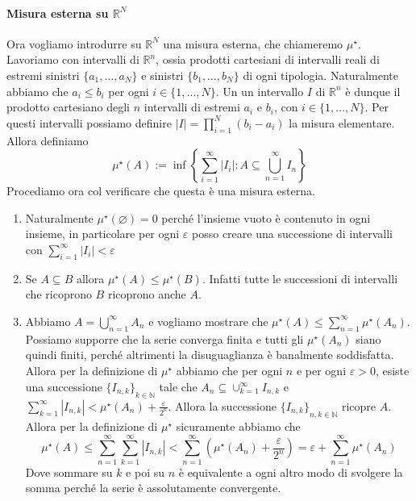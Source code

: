 \paragraph{Misura esterna su \(\mathbb{R}^{N}\)}
Ora vogliamo introdurre su \(\mathbb{R}^{N}\) una misura esterna, che chiameremo
\(\mu^\star\). Lavoriamo con intervalli di \(\mathbb{R}^{n}\), ossia prodotti
cartesiani di intervalli reali di estremi sinistri \(\{a_{1}, \dots, a_{N}\} \)
e sinistri \(\{b_{1}, \dots, b_{N}\} \) di ogni tipologia. Naturalmente abbiamo
che \(a_{i} \le b_{i}\) per ogni \(i \in \{1, \dots, N\}\). Un un intervallo \(I\) di
\(\mathbb{R}^{n}\) è dunque il prodotto cartesiano degli \(n\) intervalli di
estremi \(a_{i}\) e \(b_{i}\), con \(i \in \{1, \dots, N\} \). Per questi
intervalli possiamo definire \(|I| = \prod_{i=1}^{N}(b_{i} - a_{i})\) la misura
elementare. Allora definiamo 
\[
    \mu^\star(A) := \inf\left\{ \sum_{i=1}^{\infty} |I_{i}| : A \subseteq
    \bigcup_{n = 1}^{\infty}I_{n} \right\}
\]
Procediamo ora col verificare che questa è una misura esterna.
\begin{enumerate}[label = \arabic*.]
    \item Naturalmente \(\mu^\star(\varnothing) = 0\) perché l'insieme vuoto è
        contenuto in ogni insieme, in particolare per ogni \(\varepsilon\) posso
        creare una successione di intervalli con \(\sum_{i=1}^{\infty} |I_{i}|
        <\varepsilon \) 
    \item Se \(A \subseteq B \) allora \(\mu^\star(A) \le \mu^\star(B)\).
        Infatti tutte le successioni di intervalli che ricoprono \(B\) ricoprono
        anche \(A\).
    \item Abbiamo \(A = \bigcup_{n=1}^{\infty}A_{n} \) e vogliamo mostrare che
        \(\mu^\star(A) \le \sum_{n=1}^{\infty} \mu^\star(A_{n}) \). Possiamo
        supporre che la serie converga finita e tutti gli \(\mu^\star(A_{n})\)
        siano quindi finiti, perché altrimenti la disuguaglianza è
        banalmente soddisfatta. Allora per la definizione di \(\mu^\star\)
        abbiamo che per ogni \(n\) e per ogni \(\varepsilon>0\), esiste una
        successione \({\{I_{n, k}\}}_{k \in \mathbb{N}} \) tale che \(A_{n}
        \subseteq \cup_{k=1}^{\infty} I_{n, k} \) e \(\sum_{k=1}^{\infty}
        |I_{n,k}| < \mu^\star(A_{n}) + \frac{\varepsilon}{2^{n}} \). Allora
        la successione \({\{I_{n, k}\}}_{n, k \in \mathbb{N}} \) ricopre \(A\).
        Allora per la definizione di \(\mu^\star\) sicuramente abbiamo che
        \[
            \mu^\star(A) \le \sum_{n=1}^{\infty} \sum_{k=1}^{\infty} |I_{n, k}|
            < \sum_{n=1}^{\infty} \left( \mu^\star(A_{n}) +
            \frac{\varepsilon}{2^{n}} \right) = \varepsilon + \sum_{n=1}^{\infty}
            \mu^\star(A_{n})
        \]
        Dove sommare su \(k\) e poi su \(n\) è equivalente a ogni altro modo di
        svolgere la somma perché la serie è assolutamente convergente.
\end{enumerate}
